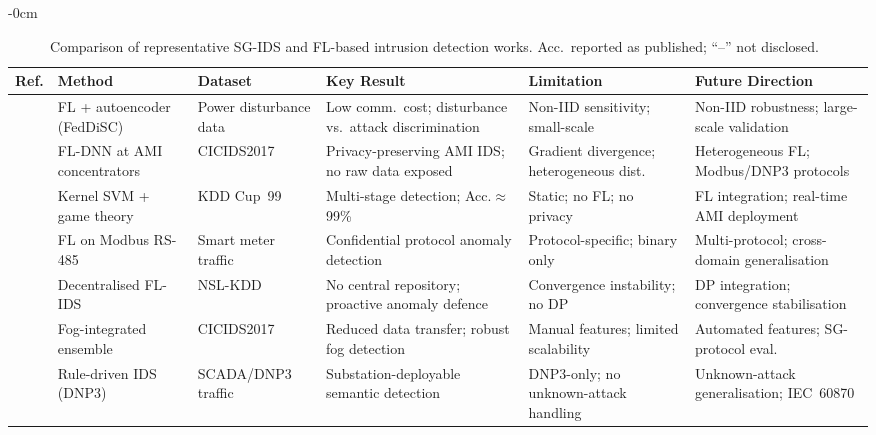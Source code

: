 \documentclass[sensors,article,submit,pdftex,moreauthors]{Definitions/mdpi}
\begin{document}
\begin{table}[H]
\caption{Comparison of representative SG-IDS and FL-based intrusion detection works. Acc.\ reported as published; ``--'' not disclosed.~\label{tab:related_work_ids}}
	\begin{adjustwidth}{-\extralength}{0cm}
	{\footnotesize
		\begin{tabularx}{\fulllength}{%
  >{\raggedright\arraybackslash}p{0.9cm}%
  >{\raggedright\arraybackslash}p{2.0cm}%
  >{\raggedright\arraybackslash}p{1.5cm}%
  >{\raggedright\arraybackslash}X%
  >{\raggedright\arraybackslash}X%
  >{\raggedright\arraybackslash}X%
}
\toprule
\textbf{Ref.} & \textbf{Method} & \textbf{Dataset} & \textbf{Key Result} & \textbf{Limitation} & \textbf{Future Direction} \\
\midrule
\cite{husnoo2023feddisc}   & FL + autoencoder (FedDiSC)       & Power disturbance data   & Low comm.\ cost; disturbance vs.\ attack discrimination    & Non-IID sensitivity; small-scale              & Non-IID robustness; large-scale validation \\
\cite{liang2023intrusion}  & FL-DNN at AMI concentrators      & CICIDS2017               & Privacy-preserving AMI IDS; no raw data exposed            & Gradient divergence; heterogeneous dist.      & Heterogeneous FL; Modbus/DNP3 protocols \\
\cite{liu2017kernel}       & Kernel SVM + game theory         & KDD Cup~99               & Multi-stage detection; Acc.${\approx}$99\%                 & Static; no FL; no privacy                     & FL integration; real-time AMI deployment \\
\cite{hossain2023modbus}   & FL on Modbus RS-485              & Smart meter traffic      & Confidential protocol anomaly detection                    & Protocol-specific; binary only                & Multi-protocol; cross-domain generalisation \\
\cite{aashmi2023federated} & Decentralised FL-IDS             & NSL-KDD                  & No central repository; proactive anomaly defence           & Convergence instability; no DP                & DP integration; convergence stabilisation \\
\cite{Alsirhani2025}       & Fog-integrated ensemble          & CICIDS2017               & Reduced data transfer; robust fog detection                & Manual features; limited scalability          & Automated features; SG-protocol eval. \\
\cite{Mohan2024}           & Rule-driven IDS (DNP3)           & SCADA/DNP3 traffic       & Substation-deployable semantic detection                   & DNP3-only; no unknown-attack handling         & Unknown-attack generalisation; IEC~60870 \\

\end{tabularx}}
\end{adjustwidth}
\end{table}
\end{document}

